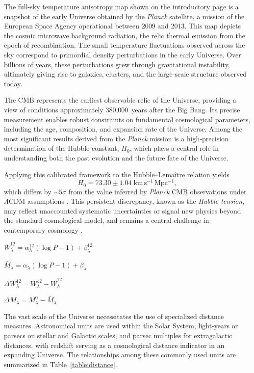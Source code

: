The full-sky temperature anisotropy map shown on the introductory page is a snapshot of the early Universe obtained by the \emph{Planck} satellite, a mission of the European Space Agency operational between 2009 and 2013. This map depicts the cosmic microwave background radiation, the relic thermal emission from the epoch of recombination. The small temperature fluctuations observed across the sky correspond to primordial density perturbations in the early Universe. Over billions of years, these perturbations grew through gravitational instability, ultimately giving rise to galaxies, clusters, and the large-scale structure observed today.

The CMB represents the earliest observable relic of the Universe, providing a view of conditions approximately 380{,}000~years after the Big Bang. Its precise measurement enables robust constraints on fundamental cosmological parameters, including the age, composition, and expansion rate of the Universe. Among the most significant results derived from the \emph{Planck} mission is a high-precision determination of the Hubble constant, $H_0$, which plays a central role in understanding both the past evolution and the future fate of the Universe.


Applying this calibrated framework to the Hubble--Lemaître relation yields
\[
H_0 = 73.30 \pm 1.04 \; \mathrm{km\,s^{-1}\,Mpc^{-1}},
\]
which differs by $\sim 5\sigma$ from the value inferred by \emph{Planck} CMB observations under $\Lambda$CDM assumptions \citep{2022riess,2018planck}. This persistent discrepancy, known as the \emph{Hubble tension}, may reflect unaccounted systematic uncertainties or signal new physics beyond the standard cosmological model, and remains a central challenge in contemporary cosmology \citep{Verde2019, DiValentino2021}.


$\bar{W}^{12}_\lambda = \alpha^{12}_\lambda (\log P - 1) + \beta^{12}_\lambda$

$\bar{M}_\lambda = \alpha_\lambda (\log P - 1) + \beta_\lambda$

$\Delta W_\lambda^{12} = W_\lambda^{12} - \bar{W}^{12}_\lambda$

$\Delta M_\lambda = M_\lambda^{0} - \bar{M}_\lambda$


The vast scale of the Universe necessitates the use of specialized distance measures. Astronomical units are used within the Solar System, light-years or parsecs on stellar and Galactic scales, and parsec multiples for extragalactic distances, with redshift serving as a cosmological distance indicator in an expanding Universe. The relationships among these commonly used units are summarized in Table~\ref{table:distance}.

